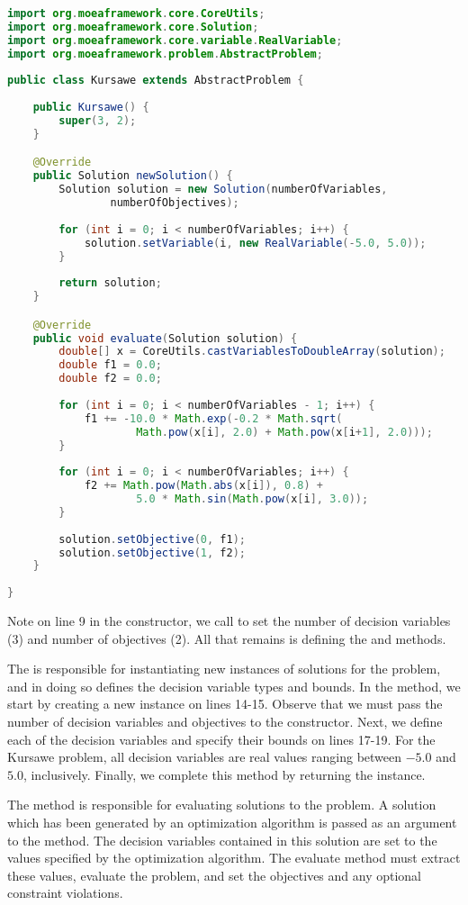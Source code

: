 \begin{lstlisting}[language=Java]
import org.moeaframework.core.CoreUtils;
import org.moeaframework.core.Solution;
import org.moeaframework.core.variable.RealVariable;
import org.moeaframework.problem.AbstractProblem;
 
public class Kursawe extends AbstractProblem {
 
	public Kursawe() {
		super(3, 2);
	}

	@Override
	public Solution newSolution() {
		Solution solution = new Solution(numberOfVariables, 
				numberOfObjectives);
 
		for (int i = 0; i < numberOfVariables; i++) {
			solution.setVariable(i, new RealVariable(-5.0, 5.0));
		}
 
		return solution;
	}

	@Override
	public void evaluate(Solution solution) {
		double[] x = CoreUtils.castVariablesToDoubleArray(solution);
		double f1 = 0.0;
		double f2 = 0.0;
   	 
		for (int i = 0; i < numberOfVariables - 1; i++) {
			f1 += -10.0 * Math.exp(-0.2 * Math.sqrt(
					Math.pow(x[i], 2.0) + Math.pow(x[i+1], 2.0)));
		}
 
		for (int i = 0; i < numberOfVariables; i++) {
			f2 += Math.pow(Math.abs(x[i]), 0.8) +  
					5.0 * Math.sin(Math.pow(x[i], 3.0));
		}
 
		solution.setObjective(0, f1);
		solution.setObjective(1, f2);
	}
 
}
\end{lstlisting}

Note on line 9 in the constructor, we call  to set the number of decision variables (3) and number of objectives (2).  All that remains is defining the  and  methods.

The  is responsible for instantiating new instances of solutions for the problem, and in doing so defines the decision variable types and bounds.  In the  method, we start by creating a new  instance on lines 14-15.  Observe that we must pass the number of decision variables and objectives to the  constructor.  Next, we define each of the decision variables and specify their bounds on lines 17-19.  For the Kursawe problem, all decision variables are real values ranging between $-5.0$ and $5.0$, inclusively.  Finally, we complete this method by returning the  instance.

The  method is responsible for evaluating solutions to the problem.  A solution which has been generated by an optimization algorithm is passed as an argument to the  method.  The decision variables contained in this solution are set to the values specified by the optimization algorithm.  The evaluate method must extract these values, evaluate the problem, and set the objectives and any optional constraint violations.

